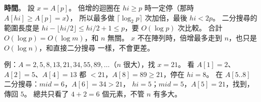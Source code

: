 \begin{pastsoln}
\textbf{時間}。 設 $x = A[p]$。 倍增的迴圈在 $\mathit{hi} \ge p$ 時一定停（那時 $A[\mathit{hi}] \ge A[p] = x$），
所以最多做 $\lceil \log_2 p \rceil$ 次加倍，最後 $\mathit{hi} < 2p$。 二分搜尋的範圍長度是
$\mathit{hi} - \lfloor \mathit{hi}/2 \rfloor \le \mathit{hi}/2 + 1 \le p$，要 $O(\log p)$ 次比較。 合計
$O(\log p) = O(\log m)$，和 $n$ 無關。 $x$ 不在陣列時，倍增最多走到 $n$，也只是 $O(\log n)$，和直接二分搜尋
一樣，不會更差。

例：$A = 2, 5, 8, 13, 21, 34, 55, 89, \ldots$（$n$ 很大），找 $x = 21$。 看 $A[1] = 2$、$A[2] = 5$、$A[4] = 13$
都 $< 21$，$A[8] = 89 \ge 21$，停在 $\mathit{hi} = 8$。 在 $A[5..8]$ 二分搜尋：$\mathit{mid} = 6$，$A[6] = 34 > 21$，
$\mathit{hi} = 5$；$\mathit{mid} = 5$，$A[5] = 21$，找到，傳回 $5$。 總共只看了 $4 + 2 = 6$ 個元素，不管 $n$ 有多大。
\end{pastsoln}

